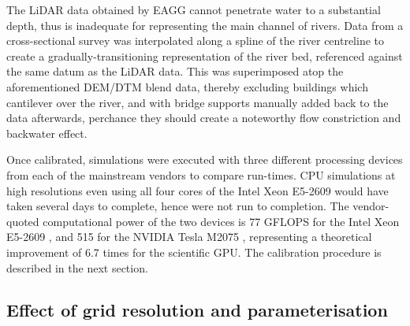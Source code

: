 The LiDAR data obtained by EAGG cannot penetrate water to a substantial depth, thus is inadequate for representing the main channel of rivers. Data from a cross-sectional survey was interpolated along a spline of the river centreline to create a gradually-transitioning representation of the river bed, referenced against the same datum as the LiDAR data. This was superimposed atop the aforementioned DEM/DTM blend data, thereby excluding buildings which cantilever over the river, and with bridge supports manually added back to the data afterwards, perchance they should create a noteworthy flow constriction and backwater effect.

Once calibrated, simulations were executed with three different processing devices from each of the mainstream vendors to compare run-times. CPU simulations at high resolutions even using all four cores of the Intel Xeon E5-2609 would have taken several days to complete, hence were not run to completion. The vendor-quoted computational power of the two devices is 77 GFLOPS for the Intel Xeon E5-2609 \citep{IntelCorporation2012}, and 515 for the NVIDIA Tesla M2075 \citep{NVIDIACorporation2011}, representing a theoretical improvement of 6.7 times for the scientific GPU. The calibration procedure is described in the next section.

\subsection{Effect of grid resolution and parameterisation}

